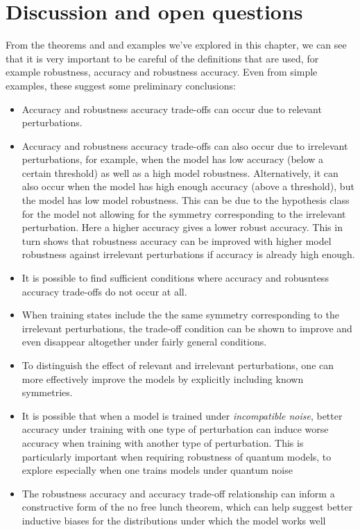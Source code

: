 \documentclass[onecolumn,prx, superscriptaddress,longbibliography,margin=1mm 11pt]{revtex4-2}
\begin{document}
\section{Discussion and open questions}
From the theorems and and examples we've explored in this chapter, we can see that it is very important to be careful of the definitions that are used, for example robustness, accuracy and robustness accuracy. Even from simple examples, these suggest some preliminary conclusions:
\begin{itemize}
    \item Accuracy and robustness accuracy trade-offs can occur due to relevant perturbations. 
    \item Accuracy and robustness accuracy trade-offs can also occur due to irrelevant perturbations, for example, when the model has low accuracy (below a certain threshold) as well as a high model robustness. Alternatively, it can also occur when the model has high enough accuracy (above a threshold), but the model has low model robustness. This can be due to the hypothesis class for the model not allowing for the symmetry corresponding to the irrelevant perturbation. Here a higher accuracy gives a lower robust accuracy. This in turn shows that robustness accuracy can be improved with higher model robustness against irrelevant perturbations if accuracy is already high enough.
    \item It is possible to find sufficient conditions where accuracy and robusntess accuracy trade-offs do not occur at all.
    \item When training states include the the same symmetry corresponding to the irrelevant perturbations, the trade-off condition can be shown to improve and even disappear altogether under fairly general conditions.
     \item To distinguish the effect of  relevant and irrelevant perturbations, one can more effectively improve the models by  explicitly including known symmetries.
    \item  It is possible that when a model is trained under \textit{incompatible noise}, better accuracy under training with one type of perturbation can induce worse accuracy when training with another type of perturbation. This is particularly important when requiring robustness of quantum models, to explore especially when one trains models under quantum noise
    \item The robustness accuracy and accuracy trade-off relationship can inform a constructive form of the no free lunch theorem, which can help suggest better inductive biases for the distributions under which the model works well
\end{itemize}
\end{document}
